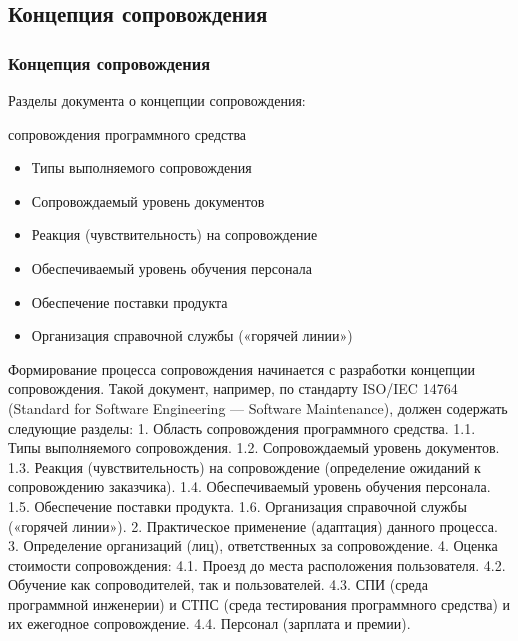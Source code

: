 \documentclass{../industrial-development}
\begin{document}
\subsection{Концепция сопровождения}
\begin{frame} \frametitle{Концепция сопровождения}
Разделы документа о концепции сопровождения:
	\begin{enumerate}[1]  сопровождения программного средства
	\end{enumerate}
		\begin{itemize}
		\item Типы выполняемого сопровождения
		\item Сопровождаемый уровень документов
		\item Реакция (чувствительность) на сопровождение
		\item Обеспечиваемый уровень обучения персонала 
		\item Обеспечение поставки продукта
		\item Организация справочной службы («горячей линии») 
		\end{itemize}
\end{frame}
\lecturenotes
Формирование процесса сопровождения начинается с разработки концепции сопровождения. Такой документ, например, по стандарту ISO/IEC 14764 (Standard for Software Engineering — Software Maintenance), должен содержать следующие разделы:
1. Область сопровождения программного средства.
    1.1. Типы выполняемого сопровождения.
    1.2. Сопровождаемый уровень документов.
    1.3. Реакция (чувствительность) на сопровождение (определение ожиданий к сопровождению заказчика). 
    1.4. Обеспечиваемый уровень обучения персонала.
    1.5. Обеспечение поставки продукта.
    1.6. Организация справочной службы («горячей линии»).
2. Практическое применение (адаптация) данного процесса.
3. Определение организаций (лиц), ответственных за сопровождение.
4. Оценка стоимости сопровождения:
    4.1. Проезд до места расположения пользователя.
    4.2. Обучение как сопроводителей, так и пользователей.
    4.3. СПИ (среда программной инженерии) и СТПС (среда тестирования программного средства) и их ежегодное сопровождение.
    4.4. Персонал (зарплата и премии).
\end{document}
